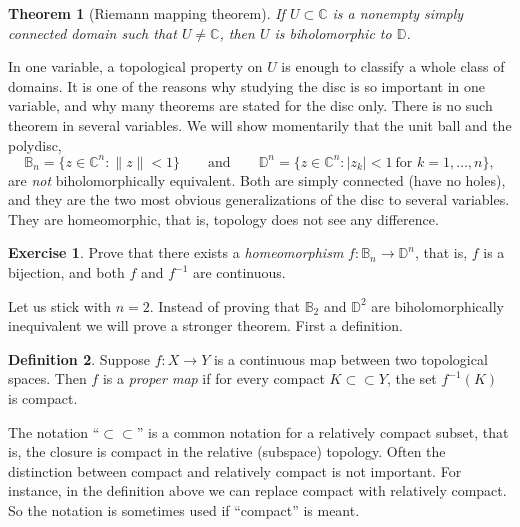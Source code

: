 \documentclass[12pt,openany]{book}
\newcommand{\sabs}[1]{\lvert {#1} \rvert}
\newcommand{\snorm}[1]{\lVert {#1} \rVert}
\newcommand{\C}{{\mathbb{C}}}
\newcommand{\D}{{\mathbb{D}}}
\newcommand{\bB}{{\mathbb{B}}}
\newcommand{\myindex}[1]{#1\index{#1}}
\theoremstyle{plain}
\newtheorem{thm}{Theorem}[section]
\theoremstyle{remark}
\theoremstyle{definition}
\newtheorem{defn}[thm]{Definition}
\newenvironment{exbox}{%
    \def\FrameCommand{\vrule width 1pt \relax\hspace{10pt}}%
    \MakeFramed{\advance\hsize-\width\FrameRestore}%
}{%
    \endMakeFramed
}
\theoremstyle{exercise}
\newtheorem{exercise}{Exercise}[section]
\theoremstyle{example}
\begin{document}
\begin{thm}[Riemann mapping theorem]
If $U \subset \C$ is a nonempty simply connected domain such that $U \neq \C$,
then $U$ is biholomorphic to $\D$.
\end{thm}

In one variable, a topological property on $U$ is enough to classify a whole
class of domains.  It is one of the reasons why studying the disc is so
important in one variable, and why many theorems are stated for
the disc only.
There is no such theorem in several variables.
We will show momentarily that the unit ball and the polydisc,
\begin{equation*}
\bB_n = \bigl\{ z \in \C^n : \snorm{z} < 1 \bigr\}
\qquad \text{and} \qquad
\D^n = \bigl\{ z \in \C^n : \sabs{z_k} < 1 ~\text{for $k=1,\ldots,n$} \bigr\} ,
\end{equation*}
are \emph{not} biholomorphically equivalent.  Both are simply
connected (have no holes), and they are the two most obvious generalizations
of the disc to several variables.  They are homeomorphic, that is, topology
does not see any difference.

\begin{exbox}
\begin{exercise}
Prove that there exists a \emph{\myindex{homeomorphism}} $f \colon \bB_n \to
\D^n$,
that is, $f$ is a bijection, and both $f$ and $f^{-1}$ are continuous.
\end{exercise}
\end{exbox}


Let us stick with $n=2$.
Instead of proving that $\bB_2$ and
$\D^2$ are biholomorphically
inequivalent we will prove a stronger theorem.  First a
definition.

\begin{defn}
Suppose $f \colon X \to Y$ is a continuous map between two topological
spaces.  Then $f$ is a \emph{\myindex{proper map}} if for every compact
%
%
$K \subset \subset Y$, the set $f^{-1}(K)$ is compact.
\end{defn}

The notation ``$\subset \subset$'' is a common notation for a relatively
compact subset, that is, the closure is compact in the relative (subspace)
topology.  Often the distinction between compact and relatively
compact is not important.  For instance, in the definition above we can replace
compact with relatively compact.
So the notation is sometimes used if ``compact'' is meant.
\end{document}
